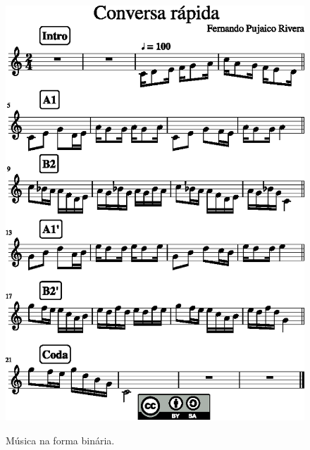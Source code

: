 \newpage
     \begin{figure}[!ht]
	     \centering
	     \href{https://drive.google.com/file/d/1RrfZT-o57iWbAx4Qks9vO_h6tBwVgNF7/view?usp=sharing}{\includegraphics[width=1.0\textwidth]{chapters/cap-musica-topicos/section-cancao-1.eps}}
	     \caption{Música na forma binária.}
	     \label{fig:section-cancao}
     \end{figure}

